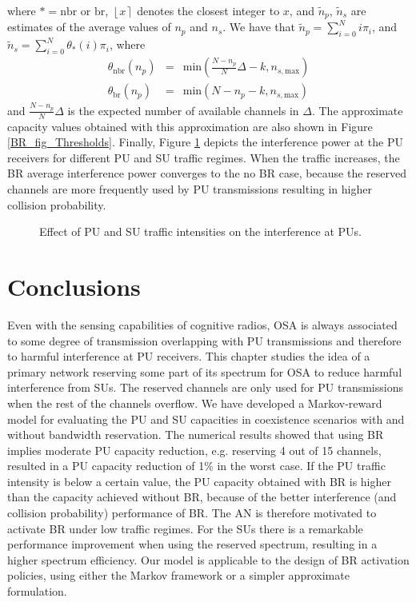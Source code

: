 where $\ast = \text{nbr}$ or $\text{br}$, $\left\lfloor x\right\rceil$ denotes the closest integer to $x$, and $\tilde{n}_{p}$, $\tilde{n}_{s}$ are estimates of the average values of $n_{p}$ and $n_{s}$. We have that $\tilde{n}_{p} = \sum_{i=0}^{N}i\pi_{i}$, and $\tilde{n}_{s} = \sum_{i=0}^{N}\theta_{\ast}(i)\pi_{i}$, where
\begin{equation}
\begin{array}{lcl}
\theta_{\text{nbr}}(n_{p}) & = & \text{min}\left(\frac{N-n_{p}}{N}\Delta-k,n_{s,\text{max}}\right)\\
\theta_{\text{br}}(n_{p}) & = & \text{min}\left(N-n_{p}-k,n_{s,\text{max}}\right)
\end{array}
\end{equation}
and $\frac{N-n_{p}}{N}\Delta$ is the expected number of available channels in $\Delta$. 
The approximate capacity values obtained with this approximation are also shown in Figure \ref{BR_fig_Thresholds}.
Finally, Figure \ref{BR_fig_sim_interference} depicts the interference power at the PU receivers for different PU and SU traffic regimes. When the traffic increases, the BR average interference power converges to the no BR case, because the reserved channels are more frequently used by PU transmissions resulting in higher collision probability.
\begin{figure}[ht]
\begin{center}
\resizebox{9cm}{!}{}
\end{center}
\caption{Effect of PU and SU traffic intensities on the interference at PUs.}\label{BR_fig_sim_interference}
\end{figure}

\section{Conclusions}\label{sec:Conclusion}
Even with the sensing capabilities of cognitive radios, OSA is always associated to some degree of transmission overlapping with PU transmissions and therefore to harmful interference at PU receivers. 
This chapter studies the idea of a primary network reserving some part of its spectrum for OSA to reduce harmful interference from SUs. 
The reserved channels are only used for PU transmissions when the rest of the channels overflow.
We have developed a Markov-reward model for evaluating the PU and SU capacities in coexistence scenarios with and without bandwidth reservation.
The numerical results showed that using BR implies moderate PU capacity reduction, e.g. reserving 4 out of 15 channels, resulted in a PU capacity reduction of 1\% in the worst case. If the PU traffic intensity is below a certain value, the PU capacity obtained with BR is higher than the capacity achieved without BR, because of the better interference (and collision probability) performance of BR.  
The AN is therefore motivated to activate BR under low traffic regimes. For the SUs there is a remarkable performance improvement when using the reserved spectrum, resulting in a higher spectrum efficiency.
Our model is applicable to the design of BR activation policies, using either the Markov framework or a simpler approximate formulation.
